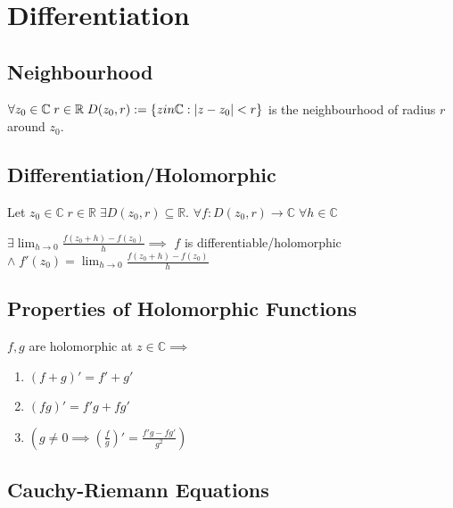 \section{Differentiation} %
\label{sec:differentiation}

\subsection{Neighbourhood} %
\label{sub:neighbourhood}

$\forall z_0 \in \mathbb{C} \; r \in \mathbb{R} \; D(z_0, r) := \{z in \mathbb{C} : \left|z - z_0\right| < r\}$ is the neighbourhood of radius $r$ around $z_0$.


\subsection{Differentiation/Holomorphic} %
\label{sub:differentiation_holomorphic}

Let $z_0 \in \mathbb{C} \; r \in \mathbb{R} \; \exists D(z_0, r) \subseteq \mathbb{R}$. $\forall f : D(z_0, r) \to \mathbb{C} \; \forall h \in \mathbb{C}$

$\exists \lim_{h \to 0} \frac{f(z_0 + h) - f(z_0)}{h} \implies$ $f$ is differentiable/holomorphic $\land \; f'(z_0) = \lim_{h \to 0} \frac{f(z_0 + h) - f(z_0)}{h}$


\subsection{Properties of Holomorphic Functions} %
\label{sub:properties_of_holomorphic_functions}
$f, g$ are holomorphic at $z \in \mathbb{C} \implies$
\begin{enumerate}
	\item $(f + g)' = f' + g'$
	\item $(fg)' = f'g + fg'$
	\item $(g \neq 0 \implies (\frac{f}{g})' = \frac{f'g - fg'}{g^2} )$
\end{enumerate}


\subsection{Cauchy-Riemann Equations} %
\label{sub:cauchy_riemann_equations}

